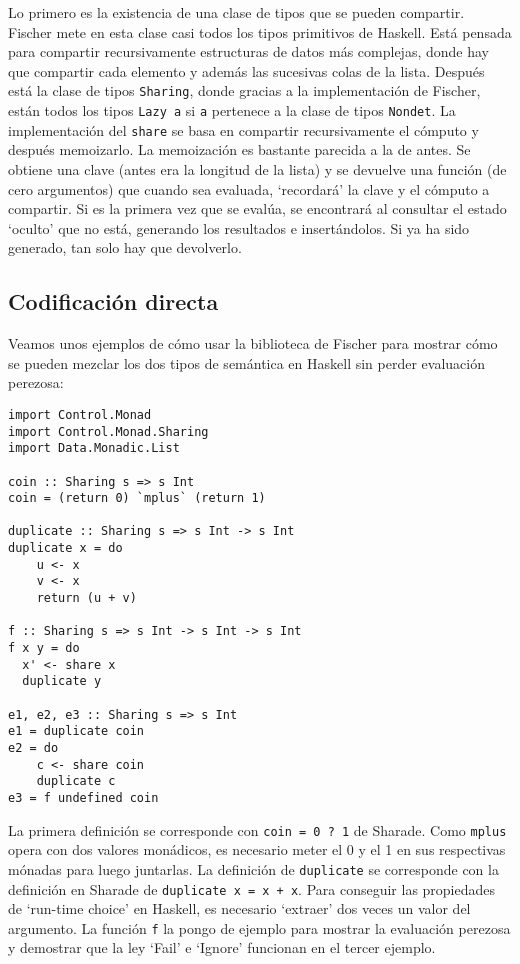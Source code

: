 \documentclass[class=article, crop=false]{standalone}
\begin{document}
Lo primero es la existencia de una clase de tipos que se pueden compartir. Fischer mete en
esta clase casi todos los tipos primitivos de Haskell. Está pensada para compartir
recursivamente estructuras de datos más complejas, donde hay que compartir cada elemento y
además las sucesivas colas de la lista. Después está la clase de tipos \verb`Sharing`, donde
gracias a la implementación de Fischer, están todos los tipos \verb`Lazy a` si \verb`a`
pertenece a la clase de tipos \verb`Nondet`. La implementación del \verb`share` se basa en
compartir recursivamente el cómputo y después memoizarlo. La memoización es bastante parecida
a la de antes. Se obtiene una clave (antes era la longitud de la lista) y se devuelve una
función (de cero argumentos) que cuando sea evaluada, `recordará' la clave y el cómputo a
compartir. Si es la primera vez que se evalúa, se encontrará al consultar el estado `oculto'
que no está, generando los resultados e insertándolos. Si ya ha sido generado, tan solo hay
que devolverlo.

\subsection{Codificación directa}\label{sec:uso_directo}
Veamos unos ejemplos de cómo usar la biblioteca de Fischer para mostrar cómo se pueden
mezclar los dos tipos de semántica en Haskell sin perder evaluación perezosa:

\begin{verbatim}
import Control.Monad
import Control.Monad.Sharing
import Data.Monadic.List

coin :: Sharing s => s Int
coin = (return 0) `mplus` (return 1)

duplicate :: Sharing s => s Int -> s Int
duplicate x = do
    u <- x
    v <- x
    return (u + v)

f :: Sharing s => s Int -> s Int -> s Int
f x y = do
  x' <- share x
  duplicate y

e1, e2, e3 :: Sharing s => s Int
e1 = duplicate coin
e2 = do
    c <- share coin
    duplicate c
e3 = f undefined coin  
\end{verbatim}

La primera definición se corresponde con \verb`coin = 0 ? 1` de Sharade. Como \verb`mplus`
opera con dos valores monádicos, es necesario meter el 0 y el 1 en sus respectivas mónadas
para luego juntarlas. La definición de \verb`duplicate` se corresponde con la definición en
Sharade de \verb`duplicate x = x + x`. Para conseguir las propiedades de `run-time choice' en
Haskell, es necesario `extraer' dos veces un valor del argumento. La función \verb`f` la
pongo de ejemplo para mostrar la evaluación perezosa y demostrar que la ley `Fail' e `Ignore'
funcionan en el tercer ejemplo.
\end{document}

